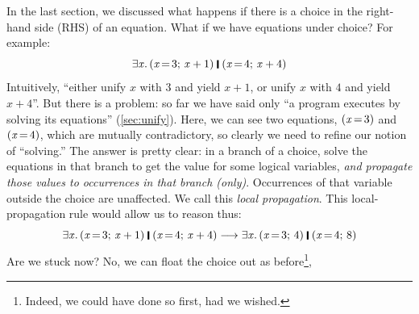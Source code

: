 \documentclass[acmsmall]{acmart}
\newcommand{\Varid}[1]{\mathit{#1}}
\begin{document}
In the last section, we discussed what happens if there is a choice in the right-hand side (RHS) of
an equation. What if we have equations under choice?  For example:
$$
\ensuremath{\exists\Varid{x}.\,(\Varid{x}\hspace{-0.14em}=\hspace{-0.14em}\mathrm{3};\,\Varid{x}\mathbin{+}\mathrm{1})\;\rule[-0.1em]{0.15em}{0.75em}\;(\Varid{x}\hspace{-0.14em}=\hspace{-0.14em}\mathrm{4};\,\Varid{x}\mathbin{+}\mathrm{4})}
$$
Intuitively, ``either unify \ensuremath{\Varid{x}} with \ensuremath{\mathrm{3}} and yield \ensuremath{\Varid{x}\mathbin{+}\mathrm{1}}, or unify \ensuremath{\Varid{x}} with \ensuremath{\mathrm{4}} and yield \ensuremath{\Varid{x}\mathbin{+}\mathrm{4}}''.
But there is a problem: so far we have said only ``a program executes by solving its equations'' (\cref{sec:unify}).
Here, we can see two equations, \ensuremath{(\Varid{x}\hspace{-0.14em}=\hspace{-0.14em}\mathrm{3})} and \ensuremath{(\Varid{x}\hspace{-0.14em}=\hspace{-0.14em}\mathrm{4})}, which are mutually contradictory,
so clearly we need to refine our notion of ``solving.''
The answer is pretty clear: in a branch of a choice, solve the equations in that branch
to get the value for some logical variables, \emph{and propagate those values to occurrences in
  that branch (only)}. Occurrences of that variable outside the choice are unaffected.  We call
this \emph{local propagation}.
This local-propagation rule would allow us to reason thus:
$$
\ensuremath{\exists\Varid{x}.\,(\Varid{x}\hspace{-0.14em}=\hspace{-0.14em}\mathrm{3};\,\Varid{x}\mathbin{+}\mathrm{1})\;\rule[-0.1em]{0.15em}{0.75em}\;(\Varid{x}\hspace{-0.14em}=\hspace{-0.14em}\mathrm{4};\,\Varid{x}\mathbin{+}\mathrm{4})} \movesto  \ensuremath{\exists\Varid{x}.\,(\Varid{x}\hspace{-0.14em}=\hspace{-0.14em}\mathrm{3};\,\mathrm{4})\;\rule[-0.1em]{0.15em}{0.75em}\;(\Varid{x}\hspace{-0.14em}=\hspace{-0.14em}\mathrm{4};\,\mathrm{8})}
$$
Are we stuck now?  No, we can float the choice out as
before\footnote{Indeed, we could have done so first, had we wished.},
\end{document}
